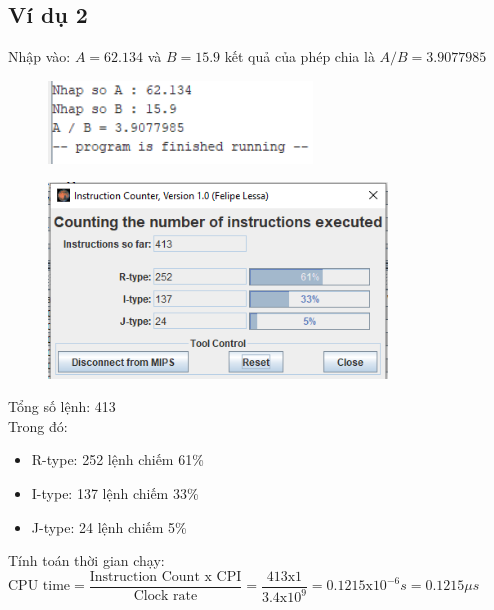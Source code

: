 \documentclass[a4paper]{article}
\begin{document}
\subsection{Ví dụ 2}
Nhập vào: $A = 62.134$ và $B = 15.9$ kết quả của phép chia là $A / B = 3.9077985$
\begin{center}
	\begin{figure}[h!]
		\begin{center}
			\includegraphics[width=7cm]{Images/6.png}
		\end{center}
	\end{figure}
\end{center}
\begin{center}
	\begin{figure}[h!]
		\begin{center}
			\includegraphics[width=9cm]{Images/7.png}
		\end{center}
	\end{figure}
\end{center}
Tổng số lệnh: 413\\
Trong đó:
\begin{itemize}
	\item R-type: 252 lệnh chiếm 61\%
	\item I-type: 137 lệnh chiếm 33\%
	\item J-type: 24 lệnh chiếm 5\%
\end{itemize}
Tính toán thời gian chạy:\\
$\text{CPU time} = \dfrac{\text{Instruction Count x CPI}}{\text{Clock rate}} = \dfrac{413\text{x}1}{3.4\text{x}10^9} = 0.1215 \text{x}10^{-6} s = 0.1215 \mu s$
\end{document}
